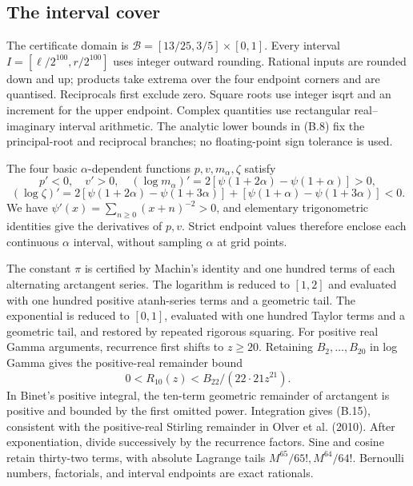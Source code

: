 \documentclass[11pt,a4paper]{article}
\begin{document}
\setcounter{subsection}{1}\subsection{The interval cover}

The certificate domain is \(\mathcal B=[13/25,3/5]\times[0,1]\). Every interval \(I=[\ell/2^{100},r/2^{100}]\) uses integer outward rounding. Rational inputs are rounded down and up; products take extrema over the four endpoint corners and are quantised. Reciprocals first exclude zero. Square roots use integer isqrt and an increment for the upper endpoint. Complex quantities use rectangular real–imaginary interval arithmetic. The analytic lower bounds in (B.8) fix the principal-root and reciprocal branches; no floating-point sign tolerance is used.

The four basic \(\alpha\)-dependent functions \(p,v,m_\alpha,\zeta\) satisfy
\[
p'<0,\quad v'>0,\quad
(\log m_\alpha)'=2[\psi(1+2\alpha)-\psi(1+\alpha)]>0,
\]
\begin{equation*}\tag{B.14}
(\log\zeta)'=2[\psi(1+2\alpha)-\psi(1+3\alpha)]
 +[\psi(1+\alpha)-\psi(1+3\alpha)]<0.
\end{equation*}
We have \(\psi'(x)=\sum_{n\ge0}(x+n)^{-2}>0\), and elementary trigonometric identities give the derivatives of \(p,v\). Strict endpoint values therefore enclose each continuous \(\alpha\) interval, without sampling \(\alpha\) at grid points.

The constant \(\pi\) is certified by Machin's identity and one hundred terms of each alternating arctangent series. The logarithm is reduced to \([1,2]\) and evaluated with one hundred positive atanh-series terms and a geometric tail. The exponential is reduced to \([0,1]\), evaluated with one hundred Taylor terms and a geometric tail, and restored by repeated rigorous squaring. For positive real Gamma arguments, recurrence first shifts to \(z\ge20\). Retaining \(B_2,\ldots,B_{20}\) in log Gamma gives the positive-real remainder bound
\begin{equation*}\tag{B.15}
0<R_{10}(z)<B_{22}/(22\cdot21z^{21}).
\end{equation*}
In Binet's positive integral, the ten-term geometric remainder of arctangent is positive and bounded by the first omitted power. Integration gives (B.15), consistent with the positive-real Stirling remainder in Olver et al. (2010). After exponentiation, divide successively by the recurrence factors. Sine and cosine retain thirty-two terms, with absolute Lagrange tails \(M^{65}/65!,M^{64}/64!\). Bernoulli numbers, factorials, and interval endpoints are exact rationals.
\end{document}
